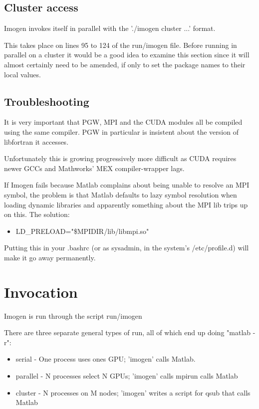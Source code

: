 \documentclass[letterpaper,12pt,twocolumn]{article}
\begin{document}
\subsection{Cluster access}

Imogen invokes itself in parallel with the './imogen cluster ...' format.

This takes place on lines 95 to 124 of the run/imogen file. Before running
in parallel on a cluster it would be a good idea to examine this section since
it will almost certainly need to be amended, if only to set the package
names to their local values.

\subsection{Troubleshooting}

It is very important that PGW, MPI and the CUDA modules all be compiled
using the same compiler. PGW in particular is insistent about the version
of libfortran it accesses.

Unfortunately this is growing progressively more difficult as CUDA requires
newer GCCs and Mathworks' MEX compiler-wrapper lags.

If Imogen fails because Matlab complains about being unable to resolve an MPI
symbol, the problem is that Matlab defaults to lazy symbol resolution when
loading dynamic libraries and apparently something about the MPI lib trips
up on this. The solution:
\begin{itemize} \item LD\_PRELOAD="\$MPIDIR/lib/libmpi.so"
\end{itemize}
Putting this in your .bashrc (or as sysadmin, in the system's /etc/profile.d) will
make it go away permanently.

\section{Invocation}

Imogen is run through the script run/imogen

There are three separate general types of run, all of which end up doing "matlab -r":
\begin{itemize}
\item serial - One process uses ones GPU; 'imogen' calls Matlab.
\item parallel - N processes select N GPUs; 'imogen' calls mpirun calls Matlab
\item cluster - N processes on M nodes; 'imogen' writes a script for qsub that calls Matlab
\end{itemize}
\end{document}
